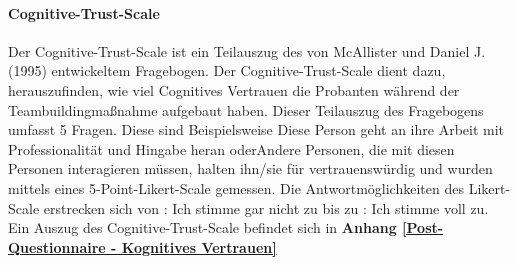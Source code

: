 \documentclass[a4paper,11pt]{article}%
\renewcommand{\\}{\vspace*{0.5\baselineskip} \newline}
\begin{document}
%			

		\paragraph{Cognitive-Trust-Scale}
Der Cognitive-Trust-Scale ist ein Teilauszug des von McAllister und Daniel J. (1995) \citep[p.37]{mcallister1995affect} entwickeltem Fragebogen. Der Cognitive-Trust-Scale dient dazu, herauszufinden, wie viel Cognitives Vertrauen die Probanten während der Teambuildingmaßnahme aufgebaut haben. Dieser Teilauszug des Fragebogens umfasst 5 Fragen. Diese sind Beispielsweise \flqq Diese Person geht an ihre Arbeit mit Professionalität und Hingabe heran \frqq oder\flqq Andere Personen, die mit diesen Personen interagieren müssen, halten ihn/sie für vertrauenswürdig und wurden mittels eines 5-Point-Likert-Scale gemessen. Die Antwortmöglichkeiten des Likert-Scale erstrecken sich von : Ich stimme gar nicht zu \frqq bis zu : Ich stimme voll zu. 
\\Ein Auszug des Cognitive-Trust-Scale befindet sich in \textbf{Anhang \ref{Post-Questionnaire - Kognitives Vertrauen}}

  

\end{document}
